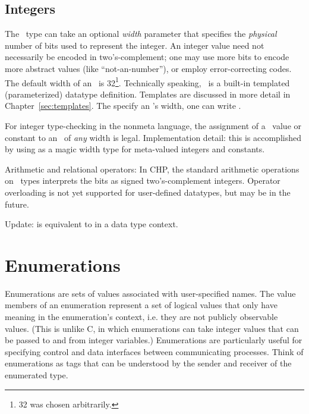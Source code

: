 \subsection{Integers}
\label{sec:datatypes:builtin:int}

The \int\ type can take an optional \emph{width} parameter that specifies
the \emph{physical} number of bits used to represent the integer.  
An integer value need not necessarily be encoded in two's-complement; 
one may use more bits to encode more abstract values (like ``not-an-number''), 
or employ error-correcting codes.  
The default width of an \int\ is 32\footnote{32 was chosen arbitrarily.}.
Technically speaking, \int\ is a built-in templated (parameterized) 
datatype definition.  
Templates are discussed in more detail in Chapter~\ref{sec:templates}.  
The specify an \int's width, one can write \ttt{>}.  

For integer type-checking in the nonmeta language, 
the assignment of a \pint\ value or constant to an \int\ of
\emph{any} width is legal.  
Implementation detail: this is accomplished by using 
as a magic width type for meta-valued integers and constants.  

Arithmetic and relational operators:
In CHP, the standard arithmetic operations on \int\ types interprets
the bits as signed two's-complement integers.  
Operator overloading is not yet supported for user-defined datatypes, 
but may be in the future.  

Update:  is equivalent to  in a data type context.  


\section{Enumerations}
\label{sec:datatype:enum}

Enumerations are sets of values associated with user-specified names.  
The value members of an enumeration represent a set of 
logical values that only have meaning in the enumeration's context, 
i.e. they are not publicly observable values.  
(This is unlike C, in which enumerations can take integer values that 
can be passed to and from integer variables.)
Enumerations are particularly useful for specifying 
control and data interfaces between communicating processes.  
Think of enumerations as tags that can be understood by 
the sender and receiver of the enumerated type.  

